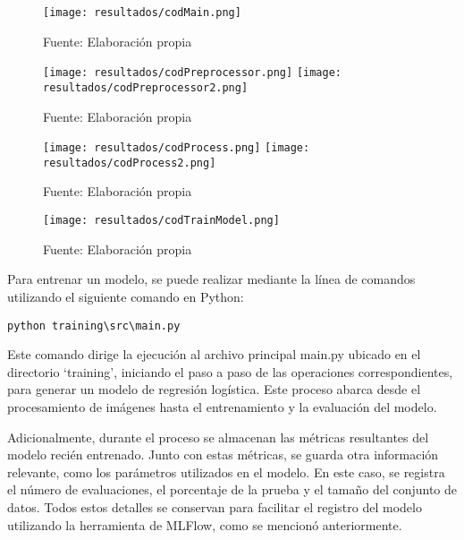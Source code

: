 \begin{figure}[h]
\centering
\caption{Código del archivo main.py}
\texttt{[image: resultados/codMain.png]}
\caption*{\footnotesize Fuente: Elaboración propia}
\label{fig:figuraCodMain}
\end{figure}

\newpage

\begin{figure}[h]
\centering
\caption{Código del archivo preprocessor.py}
\texttt{[image: resultados/codPreprocessor.png]}
\texttt{[image: resultados/codPreprocessor2.png]}
\caption*{\footnotesize Fuente: Elaboración propia}
\label{fig:figuraCodPreprocessor}
\end{figure}

\newpage

\begin{figure}[h]
\centering
\caption{Código del archivo process.py}
\texttt{[image: resultados/codProcess.png]}
\texttt{[image: resultados/codProcess2.png]}
\caption*{\footnotesize Fuente: Elaboración propia}
\label{fig:figuraCodProcess}
\end{figure}

\newpage

\begin{figure}[h]
\centering
\caption{Código del archivo train\_model.py}
\texttt{[image: resultados/codTrainModel.png]}
\caption*{\footnotesize Fuente: Elaboración propia}
\label{fig:figuraCodTrainModel}
\end{figure}

Para entrenar un modelo, se puede realizar mediante la línea de comandos utilizando el siguiente comando en Python: 
\begin{verbatim}
python training\src\main.py
\end{verbatim}

Este comando dirige la ejecución al archivo principal main.py ubicado en el directorio `training', iniciando el paso a paso de las operaciones correspondientes, para generar un modelo de regresión logística. Este proceso abarca desde el procesamiento de imágenes hasta el entrenamiento y la evaluación del modelo.

\newpage

Adicionalmente, durante el proceso se almacenan las métricas resultantes del modelo recién entrenado. Junto con estas métricas, se guarda otra información relevante, como los parámetros utilizados en el modelo. En este caso, se registra el número de evaluaciones, el porcentaje de la prueba y el tamaño del conjunto de datos. Todos estos detalles se conservan para facilitar el registro del modelo utilizando la herramienta de MLFlow, como se mencionó anteriormente.

